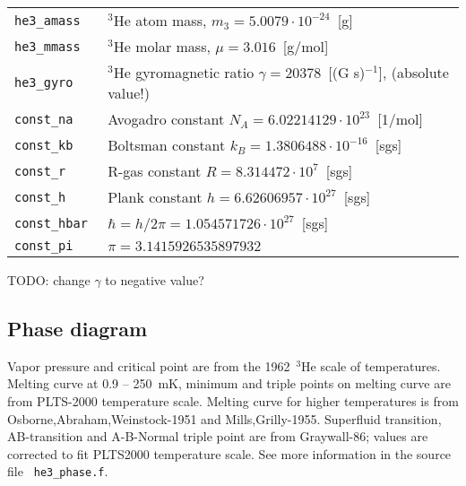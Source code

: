 \documentclass[a4paper]{article}
\begin{document}
\medskip
\begin{tabular}{lp{9cm}}
\tt he3\_amass     & $^3$He atom mass, $m_3 = 5.0079 \cdot 10^{-24}$~[g]\\
\tt he3\_mmass     & $^3$He molar mass, $\mu = 3.016$~[g/mol]\\
\tt he3\_gyro      & $^3$He gyromagnetic ratio $\gamma = 20378$~[(G s)$^{-1}$],\newline
                     (absolute value!)\\
\tt const\_na      & Avogadro constant $N_A = 6.02214129 \cdot 10^{23}$~[1/mol]\\
\tt const\_kb      & Boltsman constant $k_B = 1.3806488 \cdot 10^{-16}$~[sgs]\\
\tt const\_r       & R-gas constant $R = 8.314472 \cdot 10^{7}$~[sgs]\\
\tt const\_h       & Plank constant $h = 6.62606957 \cdot 10^{27}$~[sgs]\\
\tt const\_hbar    & $\hbar = h/2\pi = 1.054571726 \cdot 10^{27}$~[sgs]\\
\tt const\_pi      & $\pi = 3.1415926535897932$\\
\end{tabular}
\medskip

\noindent TODO: change $\gamma$ to negative value?

\eject
\subsection*{Phase diagram}

Vapor pressure and critical point are from the {1962~$^3$He scale of
temperatures}. Melting curve at 0.9 -- 250~mK, minimum and triple points
on melting curve are from {PLTS-2000 temperature scale}. Melting curve
for higher temperatures is from {Osborne,Abraham,Weinstock-1951} and
{Mills,Grilly-1955}. Superfluid transition, AB-transition and A-B-Normal
triple point are from {Graywall-86}; values are corrected to fit
PLTS2000 temperature scale. See more information in the source file {\tt
he3\_phase.f}.
\end{document}
